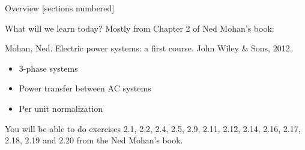 \titleframe

\begin{frame}[allowframebreaks]{Overview}
  [sections numbered]
  \tableofcontents%
\end{frame}


\begin{frame}{What will we learn today?}
    \small
    Mostly from Chapter 2 of Ned Mohan's book:

    \begin{center}
        Mohan, Ned. Electric power systems: a first course. John Wiley \& Sons, 2012.
    \end{center}

    \begin{itemize}
        \item 3-phase systems
        \item Power transfer between AC systems
        \item Per unit normalization
    \end{itemize}
    You will be able to do exercises 2.1, 2.2, 2.4, 2.5, 2.9, 2.11, 2.12, 2.14, 2.16, 2.17, 2.18, 2.19 and 2.20 from the Ned Mohan's book.
\end{frame}



